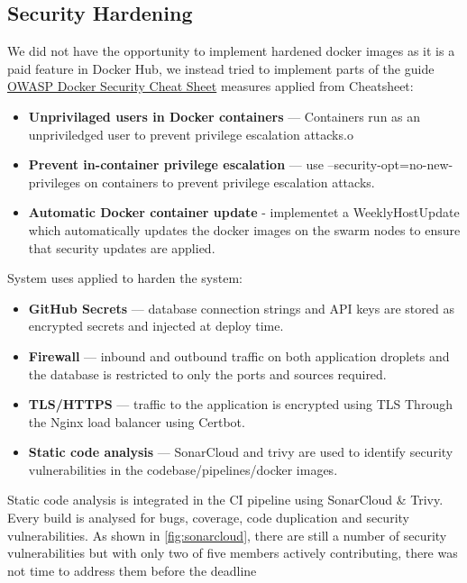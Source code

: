 \subsection{Security Hardening}

We did not have the opportunity to implement hardened docker images as it is a paid feature in Docker Hub,
we instead tried to implement parts of the guide \href{https://cheatsheetseries.owasp.org/cheatsheets/Docker_Security_Cheat_Sheet.html}{OWASP Docker Security Cheat Sheet}
\noindent measures applied from Cheatsheet:
\begin{itemize}
    \item \textbf{Unprivilaged users in Docker containers} — Containers run as an unpriviledged user to prevent privilege escalation attacks.o
    \item \textbf{Prevent in-container privilege escalation} — use --security-opt=no-new-privileges on containers to prevent privilege escalation attacks.
    \item \textbf{Automatic Docker container update} - implementet a WeeklyHostUpdate which automatically updates the docker images on the swarm nodes to ensure that security updates are applied.
\end{itemize}

\noindent System uses applied to harden the system:
\begin{itemize}
    \item \textbf{GitHub Secrets} — database connection strings and API keys are stored as encrypted secrets and injected at deploy time.
    \item \textbf{Firewall} — inbound and outbound traffic on both application droplets and the database is restricted to only the ports and sources required.
    \item \textbf{TLS/HTTPS} — traffic to the application is encrypted using TLS Through the Nginx load balancer using Certbot.
    \item \textbf{Static code analysis} — SonarCloud and trivy are used to identify security vulnerabilities in the codebase/pipelines/docker images.
\end{itemize}

\noindent Static code analysis is integrated in the CI pipeline using SonarCloud \& Trivy.
Every build is analysed for bugs, coverage, code duplication and security vulnerabilities.
As shown in \cref{fig:sonarcloud}, there are still a number of security vulnerabilities but 
with only two of five members actively contributing, there was not time to address them before the deadline

